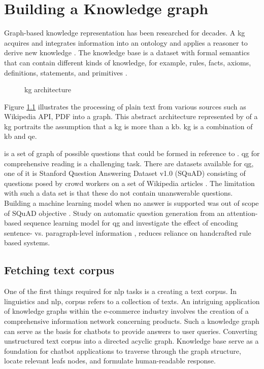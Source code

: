 \chapter{Building a Knowledge graph} \label{sec:building-kg}

Graph-based knowledge representation has been researched for decades.
A \acf{kg} acquires and integrates information into an ontology and applies a reasoner to derive new knowledge \parencite{LisaEhrlinger}.
The knowledge base is a dataset with formal semantics that can contain different kinds of knowledge, for example, rules, facts, axioms, definitions, statements, and primitives \parencite{Davies.2008cop.2006}.

\begin{figure}[h!]
    \centering
    
    \caption{\acl{kg} architecture}
    \label{fig:kg}
    \parencite[Chapter 4]{LisaEhrlinger}
\end{figure}

Figure \ref{fig:kg} illustrates the processing of plain text from various sources such as  Wikipedia API, PDF into a graph. This abstract architecture represented by  of a \acl{kg} portraits the assumption that a \acl{kg} is more than a \acf{kb}. \acl{kg} is a combination of \acl{kb} and \acf{qe}. 

 is a set of graph of possible questions that could be formed in reference to . \acf{qg} for comprehensive reading is a challenging task. There are datasets available for  \acs{qg}, one of it is Stanford Question Answering Dataset v1.0 (SQuAD) consisting of questions posed by crowd workers on a set of Wikipedia articles \parencite{PranavRajpurkar.}. The limitation with such a data set is that these do not contain unanswerable questions. Building a machine learning model when no answer is supported was out of scope of SQuAD objective \parencite{LupeHernandez}.  Study on automatic question generation from an attention-based sequence learning model \parencite{Vaswani.12062017} for  \ac{qg} and investigate the effect of encoding sentence- vs. paragraph-level information \parencite{DuXinya.29042017}, reduces reliance on handcrafted rule based systems.

\clearpage

\section{Fetching text corpus}


One of the first things required for \acf*{nlp} tasks is a creating a text corpus.
In linguistics and \acs{nlp}, corpus refers to a collection of texts. An intriguing application of knowledge graphs within the e-commerce industry involves the creation of a comprehensive information network concerning products. Such a knowledge graph can serve as the basis for chatbots to provide answers to user queries. Converting unstructured text corpus into a directed acyclic graph. Knowledge base serve as a foundation for chatbot applications to traverse through the graph
structure, locate relevant leafs nodes, and formulate human-readable response.


